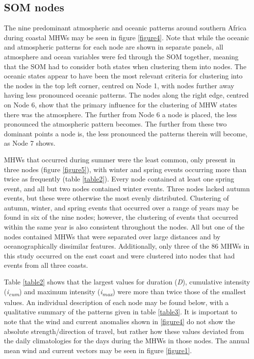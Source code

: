 \documentclass[utf8]{frontiersSCNS}
\begin{document}
\subsection{SOM nodes}
The nine predominant atmospheric and oceanic patterns around southern Africa during coastal MHWs may be seen in figure \ref{figure4}. Note that while the oceanic and atmospheric patterns for each node are shown in separate panels, all atmosphere and ocean variables were fed through the SOM together, meaning that the SOM had to consider both states when clustering them into nodes. The oceanic states appear to have been the most relevant criteria for clustering into the nodes in the top left corner, centred on Node 1, with nodes further away having less pronounced oceanic patterns. The nodes along the right edge, centred on Node 6, show that the primary influence for the clustering of MHW states there was the atmosphere. The further from Node 6 a node is placed, the less pronounced the atmospheric pattern becomes. The further from these two dominant points a node is, the less pronounced the patterns therein will become, as Node 7 shows.

MHWs that occurred during summer were the least common, only present in three nodes (figure \ref{figure5}), with winter and spring events occurring more than twice as frequently (table \ref{table2}). Every node contained at least one spring event, and all but two nodes contained winter events. Three nodes lacked autumn events, but these were otherwise the most evenly distributed. Clustering of autumn, winter, and spring events that occurred over a range of years may be found in six of the nine nodes; however, the clustering of events that occurred within the same year is also consistent throughout the nodes. All but one of the nodes contained MHWs that were separated over large distances and by oceanographically dissimilar features. Additionally, only three of the 86 MHWs in this study occurred on the east coast and were clustered into nodes that had events from all three coasts.

Table \ref{table2} shows that the largest values for duration (\emph{D}), cumulative intensity (\emph{i\textsubscript{cum}}) and maximum intensity (\emph{i\textsubscript{max}}) were more than twice those of the smallest values. An individual description of each node may be found below, with a qualitative summary of the patterns given in table \ref{table3}. It is important to note that the wind and current anomalies shown in \ref{figure4} do not show the absolute strength/direction of travel, but rather how these values deviated from the daily climatologies for the days during the MHWs in those nodes. The annual mean wind and current vectors may be seen in figure \ref{figure1}.
\end{document}
